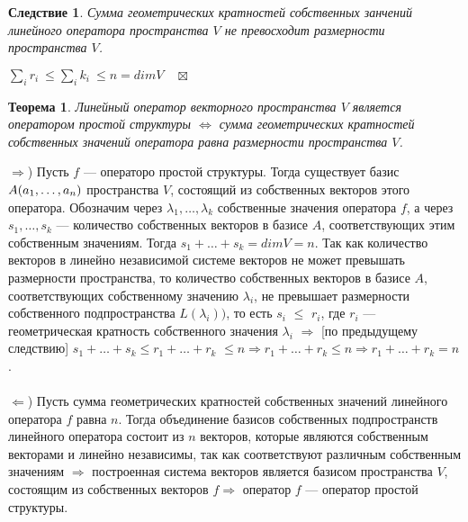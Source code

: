\newtheorem*{cor11_9_2}{Следствие}\begin{cor11_9_2}Сумма геометрических кратностей собственных занчений линейного оператора пространства $V$ не превосходит размерности пространства $V$.
\end{cor11_9_2}\begin{Proof}
	$ \sum\limits_i r_i \ \leqslant \sum\limits_i k_i \ \leqslant n = dim V \quad \boxtimes$
\end{Proof}
\newtheorem*{th11_9_1}{Теорема}\begin{th11_9_1}Линейный оператор векторного пространства $V$ является оператором простой структуры $\Longleftrightarrow$
	сумма геометрических кратностей собственных значений оператора равна размерности пространства $V$.
\end{th11_9_1}\begin{Proof}
	$\Rightarrow$) Пусть $f$ --- операторо простой структуры. Тогда существует базис $A(a_1,\dots,a_n)$ пространства $V$, состоящий из собственных векторов этого оператора. Обозначим через $\lambda_1, \dots, \lambda_k$ собственные значения оператора $f$, а через $s_1, \dots, s_k$ --- количество собственных векторов в базисе $A$, соответствующих этим собственным значениям. Тогда $s_1 + \ldots + s_k = dim V = n$. Так как количество векторов в линейно независимой системе векторов не может превышать размерности пространства, то количество собственных векторов в базисе $A$, соответствующих собственному значению $\lambda_i$, не превышает размерности собственного подпространства $L(\lambda_i))$, то есть $s_i$ $\leqslant$ $r_i$, где $r_i$ --- геометрическая кратность собственного значения $\lambda_i$ $\Rightarrow$ [по предыдущему следствию] $s_1 + \ldots + s_k \leqslant r_1 + \ldots + r_k$ $\leqslant n \Rightarrow r_1 + \ldots + r_k \leqslant n\Rightarrow r_1 + \ldots + r_k = n$.\\\\
	$ \Leftarrow$) Пусть сумма геометрических кратностей собственных значений линейного оператора $f$ равна $n$. Тогда объединение базисов собственных подпространств линейного оператора состоит из $n$ векторов, которые являются собственным векторами и линейно независимы, так как соответствуют различным собственным значениям $\Rightarrow$ построенная система векторов является базисом пространства $V$, состоящим из собственных векторов $f \Rightarrow$ оператор $f$ --- оператор простой структуры.
\end{Proof}











